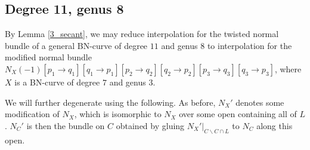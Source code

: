 \documentclass[11pt]{amsart}
\theoremstyle{definition}
\theoremstyle{remark}
\begin{document}
\subsection{Degree 11, genus 8}\label{11_8}

By Lemma \ref{3_secant}, we may reduce interpolation for the twisted normal bundle of a general BN-curve of degree $11$ and genus $8$ to interpolation for the modified normal bundle $N_X(-1)[p_1 \to q_1][q_1 \to p_1][p_2 \to q_2][q_2 \to p_2][p_3 \to q_3][q_3 \to p_3] $, where $X$ is a BN-curve of degree $7$ and genus $3$.  

We will further degenerate using the following.  As before, $N_X'$ denotes some modification of $N_X$, which is isomorphic to $N_X$ over some open containing all of $L$.  $N_C'$ is then the bundle on $C$ obtained by gluing $N_X'|_{C\smallsetminus C\cap L}$ to $N_C$ along this open.
\end{document}
